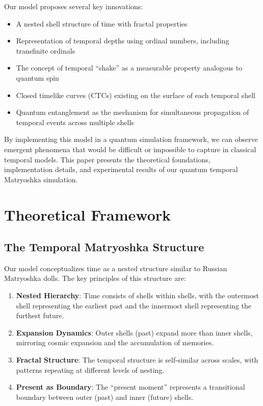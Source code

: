 \documentclass[12pt,a4paper]{article}
\begin{document}
Our model proposes several key innovations:

\begin{itemize}
    \item A nested shell structure of time with fractal properties
    \item Representation of temporal depths using ordinal numbers, including transfinite ordinals
    \item The concept of temporal ``shake'' as a measurable property analogous to quantum spin
    \item Closed timelike curves (CTCs) existing on the surface of each temporal shell
    \item Quantum entanglement as the mechanism for simultaneous propagation of temporal events across multiple shells
\end{itemize}

By implementing this model in a quantum simulation framework, we can observe emergent phenomena that would be difficult or impossible to capture in classical temporal models. This paper presents the theoretical foundations, implementation details, and experimental results of our quantum temporal Matryoshka simulation.

\section{Theoretical Framework}

\subsection{The Temporal Matryoshka Structure}

Our model conceptualizes time as a nested structure similar to Russian Matryoshka dolls. The key principles of this structure are:

\begin{enumerate}
    \item \textbf{Nested Hierarchy}: Time consists of shells within shells, with the outermost shell representing the earliest past and the innermost shell representing the furthest future.
    
    \item \textbf{Expansion Dynamics}: Outer shells (past) expand more than inner shells, mirroring cosmic expansion and the accumulation of memories.
    
    \item \textbf{Fractal Structure}: The temporal structure is self-similar across scales, with patterns repeating at different levels of nesting.
    
    \item \textbf{Present as Boundary}: The ``present moment'' represents a transitional boundary between outer (past) and inner (future) shells.
\end{enumerate}
\end{document}
